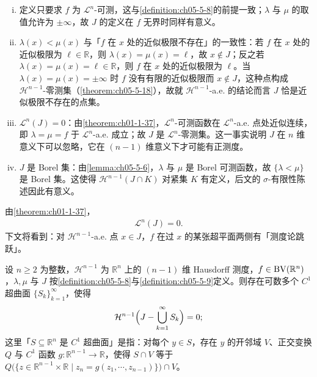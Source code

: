 \documentclass[../../main.tex]{subfiles}%
\begin{document}
\begin{remark}\label{remark:ch05-def-5-9-跳跃条件}
\begin{enumerate}[(i)]
\item 定义只要求 $f$ 为 $\mathcal{L}^n$-可测，这与\cref{definition:ch05-5-8}的前提一致；$\lambda$ 与 $\mu$ 的取值允许为 $\pm\infty$，故 $J$ 的定义在 $f$ 无界时同样有意义。%
\item $\lambda(x)<\mu(x)$ 与「$f$ 在 $x$ 处的近似极限不存在」的一致性：若 $f$ 在 $x$ 处的近似极限为 $\ell\in\mathbb{R}$，则 $\lambda(x)=\mu(x)=\ell$，故 $x\notin J$；反之若 $\lambda(x)=\mu(x)=\ell\in\mathbb{R}$，则 $f$ 在 $x$ 处的近似极限为 $\ell$。当 $\lambda(x)=\mu(x)=\pm\infty$ 时 $f$ 没有有限的近似极限而 $x\notin J$，这种点构成 $\mathcal{H}^{n-1}$-零测集（\cref{theorem:ch05-5-18}），故就 $\mathcal{H}^{n-1}$-a.e. 的结论而言 $J$ 恰是近似极限不存在的点集。%
\item $\mathcal{L}^n(J)=0$：由\cref{theorem:ch01-1-37}，$\mathcal{L}^n$-可测函数在 $\mathcal{L}^n$-a.e. 点处近似连续，即 $\lambda=\mu=f$ 于 $\mathcal{L}^n$-a.e. 成立；故 $J$ 是 $\mathcal{L}^n$-零测集。这一事实说明 $J$ 在 $n$ 维意义下可以忽略，它在 $(n-1)$ 维意义下才可能有正测度。%
\item $J$ 是 Borel 集：由\cref{lemma:ch05-5-6}，$\lambda$ 与 $\mu$ 是 Borel 可测函数，故 $\{\lambda<\mu\}$ 是 Borel 集。这使得 $\mathcal{H}^{n-1}(J\cap K)$ 对紧集 $K$ 有定义，后文的 $\sigma$-有限性陈述因此有意义。%
\end{enumerate}
\end{remark}

由\cref{theorem:ch01-1-37}，%
\begin{align*}
\mathcal{L}^n(J)=0 .
\end{align*}
下文将看到：对 $\mathcal{H}^{n-1}$-a.e. 点 $x\in J$，$f$ 在过 $x$ 的某张超平面两侧有「测度论跳跃」。

\begin{theorem}[用超曲面逼近]\label{theorem:ch05-5-17}
设 $n\geqslant2$ 为整数，$\mathcal{H}^{n-1}$ 为 $\mathbb{R}^n$ 上的 $(n-1)$ 维 Hausdorff 测度，$f\in\mathrm{BV}(\mathbb{R}^n)$，$\lambda,\mu$ 与 $J$ 按\cref{definition:ch05-5-8}与\cref{definition:ch05-5-9}定义。则存在可数多个 $C^1$ 超曲面 $\{S_k\}_{k=1}^{\infty}$，使得 %
\begin{align*}
\mathcal{H}^{n-1}\Bigl(J-\bigcup_{k=1}^{\infty}S_k\Bigr)=0 ;
\end{align*}
这里「$S\subseteq\mathbb{R}^n$ 是 $C^1$ 超曲面」是指：对每个 $y\in S$，存在 $y$ 的开邻域 $V$、正交变换 $Q$ 与 $C^1$ 函数 $g:\mathbb{R}^{n-1}\to\mathbb{R}$，使得 $S\cap V$ 等于 $Q\bigl(\{z\in\mathbb{R}^{n-1}\times\mathbb{R}\mid z_n=g(z_1,\cdots,z_{n-1})\}\bigr)\cap V$。
\end{theorem}
\end{document}

